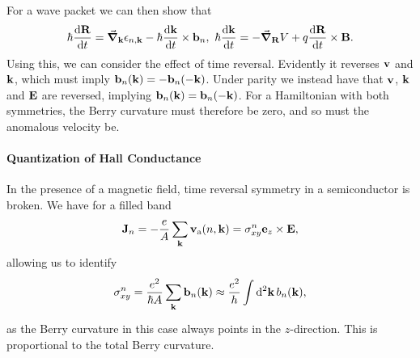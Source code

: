 For a wave packet we can then show that
\begin{align*}
	\hbar\dv{\vb{R}}{t} = \grad_{\vb{k}}\epsilon_{n, \vb{k}} - \hbar\dv{\vb{k}}{t}\times\vb{b}_{n},\ \hbar\dv{\vb{k}}{t} = -\grad_{\vb{R}}V + q\dv{\vb{R}}{t}\times\vb{B}.
\end{align*}
Using this, we can consider the effect of time reversal. Evidently it reverses $\vb{v}$ and $\vb{k}$, which must imply $\vb{b}_{n}(\vb{k}) = -\vb{b}_{n}(-\vb{k})$. Under parity we instead have that $\vb{v}$, $\vb{k}$ and $\vb{E}$ are reversed, implying $\vb{b}_{n}(\vb{k}) = \vb{b}_{n}(-\vb{k})$. For a Hamiltonian with both symmetries, the Berry curvature must therefore be zero, and so must the anomalous velocity be.

\paragraph{Quantization of Hall Conductance}
In the presence of a magnetic field, time reversal symmetry in a semiconductor is broken. We have for a filled band
\begin{align*}
	\vb{J}_{n} = -\frac{e}{A}\sum\limits_{\vb{k}}\vb{v}_{\text{a}}(n, \vb{k}) = \sigma_{xy}^{n}\vb{e}_{z}\times\vb{E},
\end{align*}
allowing us to identify
\begin{align*}
	\sigma_{xy}^{n} = \frac{e^{2}}{\hbar A}\sum\limits_{\vb{k}}\vb{b}_{n}(\vb{k}) \approx \frac{e^{2}}{h}\int\limits_{}^{}\dd[2]{\vb{k}}b_{n}(\vb{k}),
\end{align*}
as the Berry curvature in this case always points in the $z$-direction. This is proportional to the total Berry curvature.

